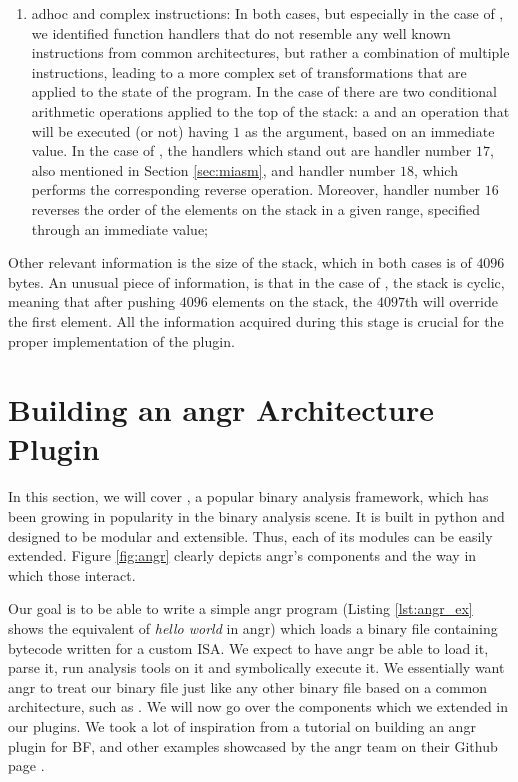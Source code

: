 \begin{enumerate}
    \item adhoc and complex instructions: In both cases, but especially in the case of , we identified function handlers that do not resemble any well known instructions from common architectures, but rather a combination of multiple instructions, leading to a more complex set of transformations that are applied to the state of the program. In the case of  there are two conditional arithmetic operations applied to the top of the stack: a  and an  operation that will be executed (or not) having $1$ as the argument, based on an immediate value. In the case of , the handlers which stand out are handler number $17$, also mentioned in Section \ref{sec:miasm}, and handler number $18$, which performs the corresponding reverse operation. Moreover, handler number $16$ reverses the order of the elements on the stack in a given range, specified through an immediate value;
\end{enumerate} 

Other relevant information is the size of the stack, which in both cases is of $4096$ bytes. An unusual piece of information, is that in the case of , the stack is cyclic, meaning that after pushing $4096$ elements on the stack, the $4097$th will override the first element. All the information acquired during this stage is crucial for the proper implementation of the  plugin.

\section{Building an angr Architecture Plugin}

In this section, we will cover  \cite{angr}, a popular binary analysis framework, which has been growing in popularity in the binary analysis scene. It is built in python and designed to be modular and extensible. Thus, each of its modules can be easily extended. Figure \ref{fig:angr} clearly depicts angr's components and the way in which those interact. 

Our goal is to be able to write a simple angr program (Listing \ref{lst:angr_ex} shows the equivalent of \emph{hello world} in angr) which loads a binary file containing bytecode written for a custom \gls{ISA}. We expect to have angr be able to load it, parse it, run analysis tools on it and symbolically execute it. We essentially want angr to treat our binary file just like any other binary file based on a common architecture, such as . We will now go over the components which we extended in our plugins. We took a lot of inspiration from a tutorial on building an angr plugin for \gls{BF}, and other examples showcased by the angr team on their Github page \cite{angr_tut}.

